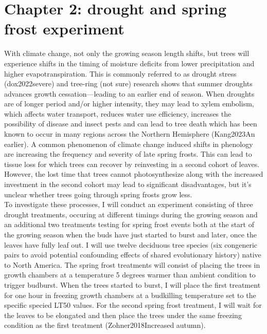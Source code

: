 \documentclass{article}
\begin{document}
\section*{Chapter 2: drought and spring frost experiment}
With climate change, not only the growing season length shifts, but trees will experience shifts in the timing of moisture deficits from lower precipitation and higher evapotranspiration. This is commonly referred to as drought stress (dox2022severe) and tree-ring (not sure) research shows that summer droughts advances growth cessation---leading to an earlier end of season. When droughts are of longer period and/or higher intensity, they may lead to xylem embolism, which affects water transport, reduces water use efficiency, increases the possibility of disease and insect pests and can lead to tree death which has been known to occur in many regions across the Northern Hemisphere (Kang2023An earlier). A common phenomenon of climate change induced shifts in phenology are increasing the frequency and severity of late spring frosts. This can lead to tissue loss for which trees can recover by reinvesting in a second cohort of leaves. However, the lost time that trees cannot photosynthesize along with the increased investment in the second cohort may lead to significant disadvantages, but it's unclear whether trees going through spring frosts grow less. \\
To investigate these processes, I will conduct an experiment consisting of three drought treatments, occuring at different timings during the growing season and an additional two treatments testing for spring frost events both at the start of the growing season when the buds have just started to burst and later, once the leaves have fully leaf out. I will use twelve deciduous tree species (six congeneric pairs to avoid potential confounding effects of shared evolutionary history) native to North America. The spring frost treatments will consist of placing the trees in growth chambers at a temperature 5 degrees warmer than ambient condition to trigger budburst. When the trees started to burst, I will place the first treatment for one hour in freezing growth chambers at a budkilling temperature set to the specific specied LT50 values. For the second spring frost treatment, I will wait for the leaves to be elongated and then place the trees under the same freezing condition as the first treatment (Zohner2018Increased autumn).\\
\end{document}
